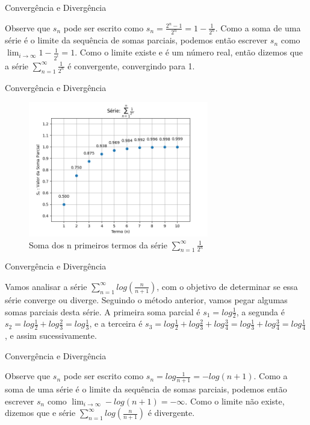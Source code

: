 \documentclass[brazil]{beamer}
\begin{document}
	\begin{frame}{Convergência e Divergência}
		
		Observe que $s_n$ pode ser escrito como $s_n = \frac{2^n - 1}{2^n} = 1 -
		\frac{1}{2^n}$. Como a soma de uma série é o limite da sequência de somas
		parciais, podemos então escrever $s_n$ como $\displaystyle\lim_{i \to \infty} 1
		- \frac{1}{2^i} = 1$. Como o limite existe e é um número real, então dizemos
		que a série $\displaystyle\sum_{n=1}^{\infty} \frac{1}{2^n}$ é convergente,
		convergindo para 1.
	\end{frame}
	\begin{frame}{Convergência e Divergência}
		\begin{figure}
			\centering
			\includegraphics[width=0.7\textwidth]{../images/serie_1.png}
			\caption{Soma dos n primeiros termos da série  $  \displaystyle\sum_{n=1}^{\infty} \frac{1}{2^n}$}
		\end{figure}
	\end{frame}
	\begin{frame}{Convergência e Divergência}
		
		Vamos analisar a série $\displaystyle\sum_{n=1}^{\infty} log (\frac{n}{n +
			1})$, com o objetivo de determinar se essa série converge ou diverge. Seguindo
		o método anterior, vamos pegar algumas somas parciais desta série. A primeira
		soma parcial é $s_1 = log \frac{1}{2}$, a segunda é $s_2 = log \frac{1}{2} +
		log \frac{2}{3} = log \frac{1}{3}$, e a terceira é $s_3 = log \frac{1}{2} + log
		\frac{2}{3} + log \frac{3}{4} = log \frac{1}{3} + log \frac{3}{4} = log
		\frac{1}{4}$, e assim sucessivamente.
	\end{frame}
	\begin{frame}{Convergência e Divergência}
		
		Observe que $s_n$ pode ser escrito como $s_n = log \frac{1}{n + 1} = -log(n
		+1)$. Como a soma de uma série é o limite da sequência de somas parciais,
		podemos então escrever $s_n$ como $\displaystyle\lim_{i \to \infty} -log(n +1)
		= -\infty$. Como o limite não existe, dizemos que e série
		$\displaystyle\sum_{n=1}^{\infty} log (\frac{n}{n + 1})$ é divergente.
	\end{frame}
\end{document}
